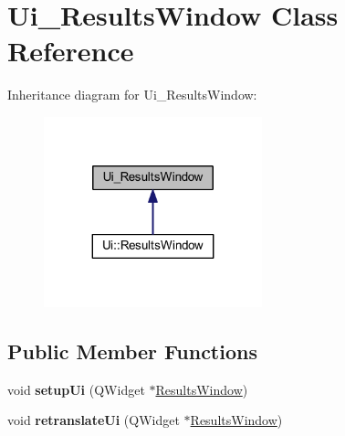\hypertarget{class_ui___results_window}{}\section{Ui\+\_\+\+Results\+Window Class Reference}
\label{class_ui___results_window}


Inheritance diagram for Ui\+\_\+\+Results\+Window\+:\nopagebreak
\begin{figure}[H]
\begin{center}
\leavevmode
\includegraphics[width=179pt]{class_ui___results_window__inherit__graph}
\end{center}
\end{figure}
\subsection*{Public Member Functions}
\begin{DoxyCompactItemize}
\item 
\mbox{\label{class_ui___results_window_aed90c2de85fe8a5e2aad1c63b6e8af71}} 
void {\bfseries setup\+Ui} (Q\+Widget $\ast$\mbox{\hyperlink{class_results_window}{Results\+Window}})
\item 
\mbox{\label{class_ui___results_window_a373444cf96474236c90128a548afffae}} 
void {\bfseries retranslate\+Ui} (Q\+Widget $\ast$\mbox{\hyperlink{class_results_window}{Results\+Window}})
\end{DoxyCompactItemize}
